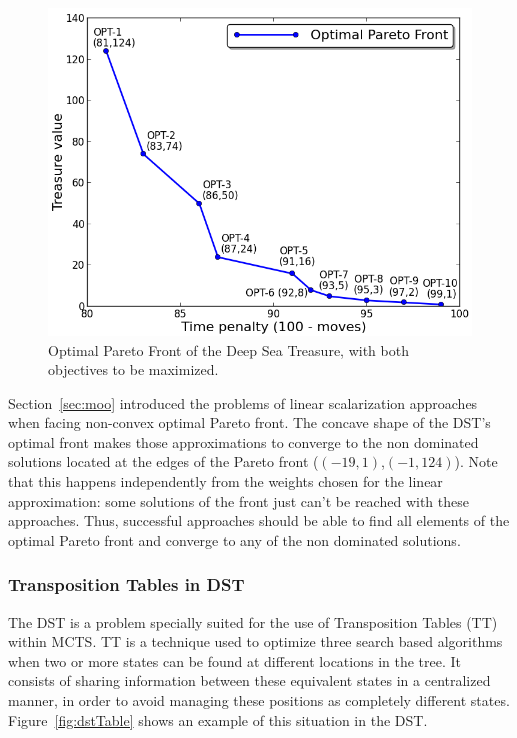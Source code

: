 \documentclass[journal]{IEEEtran}
\begin{document}
\begin{figure}[!t]
\begin{center}
\includegraphics[width=1.0\columnwidth]{img/optDst.png}
\end{center}
\caption{Optimal Pareto Front of the Deep Sea Treasure, with both objectives to be maximized.}
\label{fig:optDst}
\end{figure}

Section~\ref{sec:moo} introduced the problems of linear scalarization approaches when facing non-convex optimal Pareto front. The concave shape of the DST's optimal front makes those approximations to converge to the non dominated solutions located at the edges of the Pareto front ($(-19,1)$,$(-1,124)$). Note that this happens independently from the weights chosen for the linear approximation: some solutions of the front just can't be reached with these approaches. Thus, successful approaches should be able to find all elements of the optimal Pareto front and converge to any of the non dominated solutions.

\subsubsection{Transposition Tables in DST} \label{ssec:transTables}

The DST is a problem specially suited for the use of Transposition Tables (TT)~\cite{Childs2008} within MCTS. TT is a technique used to optimize three search based algorithms when two or more states can be found at different locations in the tree. It consists of sharing information between these equivalent states in a centralized manner, in order to avoid managing these positions as completely different states. Figure~\ref{fig:dstTable} shows an example of this situation in the DST.
\end{document}
